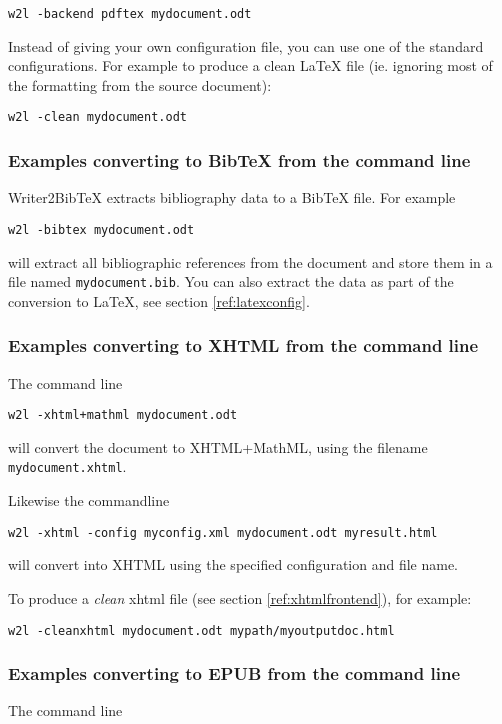 \documentclass{article}
\newcommand\textstyleSourceText[1]{\texttt{\textmd{#1}}}
\begin{document}
\begin{verbatim}
w2l -backend pdftex mydocument.odt
\end{verbatim}
{\mdseries
Instead of giving your own configuration file, you can use one of the standard configurations. For example to produce a clean LaTeX file (ie. ignoring most of the formatting from the source document):}

\begin{verbatim}
w2l -clean mydocument.odt
\end{verbatim}
\subsubsection{Examples converting to BibTeX from the command line}
{\mdseries
Writer2BibTeX extracts bibliography data to a BibTeX file. For example}

\begin{verbatim}
w2l -bibtex mydocument.odt
\end{verbatim}
{\mdseries
will extract all bibliographic references from the document and store them in a file named \textstyleSourceText{mydocument.bib}. You can also extract the data as part of the conversion to LaTeX, see section \ref{ref:latexconfig}.}

\subsubsection{Examples converting to XHTML from the command line}
{\mdseries
The command line}

\begin{verbatim}
w2l -xhtml+mathml mydocument.odt
\end{verbatim}
{\mdseries
will convert the document to XHTML+MathML, using the filename \textstyleSourceText{mydocument.xhtml}.}

{\mdseries
Likewise the commandline}

\begin{verbatim}
w2l -xhtml -config myconfig.xml mydocument.odt myresult.html
\end{verbatim}
{\mdseries
will convert into XHTML using the specified configuration and file name.}

{\mdseries
To produce a \emph{clean} xhtml file (see section \ref{ref:xhtmlfrontend}), for example:}

\begin{verbatim}
w2l -cleanxhtml mydocument.odt mypath/myoutputdoc.html
\end{verbatim}
\subsubsection{Examples converting to EPUB from the command line}
{\mdseries
The command line}
\end{document}
